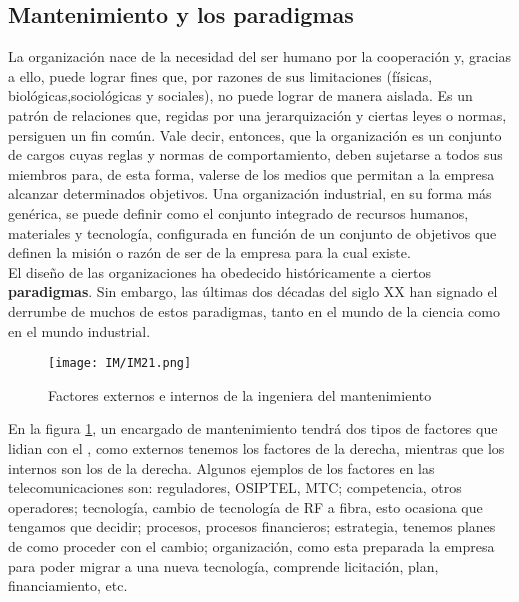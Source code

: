 \documentclass[
	12pt, %
	fleqn, %
	a4paper, %
]{LegrandOrangeBook}
\begin{document}
\subsection*{Mantenimiento y los paradigmas}
La organización nace de la necesidad del ser humano por la cooperación y, gracias a ello, puede lograr fines que, por razones de sus limitaciones (físicas, biológicas,sociológicas y sociales), no puede lograr de manera aislada. Es un patrón de relaciones que, regidas por una jerarquización y ciertas leyes o normas, persiguen un fin común. Vale decir, entonces, que la organización es un conjunto de cargos cuyas reglas y normas de comportamiento, deben sujetarse a todos sus miembros para, de esta forma, valerse de los medios que permitan a la empresa alcanzar determinados objetivos. Una organización industrial, en su forma más genérica, se puede definir como el conjunto integrado de recursos humanos, materiales y tecnología, configurada en función de un conjunto de objetivos que definen la misión o razón de ser de la empresa para la cual existe.\\
El diseño de las organizaciones ha obedecido históricamente a ciertos \textbf{paradigmas}.
Sin embargo, las últimas dos décadas del siglo XX han signado el derrumbe de
muchos de estos paradigmas, tanto en el mundo de la ciencia como en el mundo industrial.
\begin{figure}[H]
\centering
\texttt{[image: IM/IM21.png]}
\caption{Factores externos e internos de la ingeniera del mantenimiento}
\label{fig:Factores mantenimiento}
\end{figure}
En la figura \ref{fig:Factores mantenimiento}, un encargado de mantenimiento tendrá dos tipos de factores que lidian con el , como externos tenemos los factores de la derecha, mientras que los internos son los de la derecha. Algunos ejemplos de los factores en las telecomunicaciones son: reguladores, OSIPTEL, MTC; competencia, otros operadores; tecnología, cambio de tecnología de RF a fibra, esto ocasiona que tengamos que decidir; procesos, procesos financieros; estrategia, tenemos planes de como proceder con el cambio; organización, como esta preparada la empresa para poder migrar a una nueva tecnología, comprende licitación, plan, financiamiento, etc.
\end{document}
